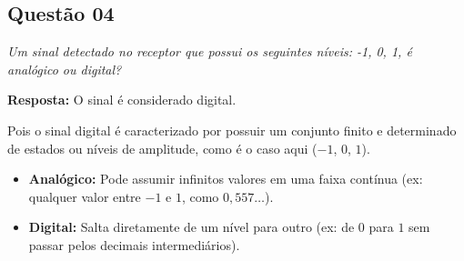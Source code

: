 \subsection*{Questão 04}

\textit{Um sinal detectado no receptor que possui os seguintes níveis: -1, 0, 1, é analógico ou digital?}

\textbf{Resposta:}
O sinal é considerado digital.\par
Pois o sinal digital é caracterizado por possuir um conjunto finito e determinado de estados ou níveis de amplitude, como é o caso aqui ($-1$, $0$, $1$).

\begin{itemize}
    \item \textbf{Analógico:} Pode assumir infinitos valores em uma faixa contínua (ex: qualquer valor entre $-1$ e $1$, como $0,557\dots$).
    \item \textbf{Digital:} Salta diretamente de um nível para outro (ex: de $0$ para $1$ sem passar pelos decimais intermediários).
\end{itemize}


